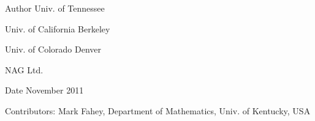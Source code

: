 \begin{DoxyAuthor}{Author}
Univ. of Tennessee 

Univ. of California Berkeley 

Univ. of Colorado Denver 

N\+A\+G Ltd. 
\end{DoxyAuthor}
\begin{DoxyDate}{Date}
November 2011 
\end{DoxyDate}
\begin{DoxyParagraph}{Contributors\+: }
Mark Fahey, Department of Mathematics, Univ. of Kentucky, U\+S\+A 
\end{DoxyParagraph}
